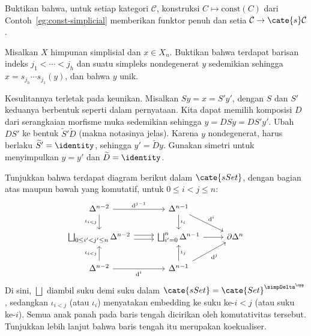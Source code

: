 
\hypertarget{o014.aljabr2.chapter8.exercises-a}{ }
\begin{Exercises}
	\item Buktikan bahwa, untuk setiap kategori $\mathcal{C}$, konstruksi
	$C\mapsto\mathrm{const}(C)$ dari Contoh~\ref{eg:const-simplicial}
	memberikan funktor penuh dan setia
	$\mathcal{C}\to\cate{s}\mathcal{C}$.

	\item Misalkan $X$ himpunan simplisial dan $x\in X_n$. Buktikan bahwa
	terdapat barisan indeks $j_1<\cdots<j_h$ dan suatu simpleks nondegenerat
	$y$ sedemikian sehingga $x=s_{j_h}\cdots s_{j_1}(y)$, dan bahwa $y$ unik.

	\begin{hint}
		Kesulitannya terletak pada keunikan. Misalkan
		$Sy=x=S'y'$, dengan $S$ dan $S'$ keduanya berbentuk seperti dalam
		pernyataan. Kita dapat memilih komposisi $D$ dari serangkaian morfisme muka
		sedemikian sehingga $y=DSy=DS'y'$. Ubah $DS'$ ke bentuk
		$\widetilde{S}'\widetilde{D}$ (makna notasinya jelas). Karena $y$
		nondegenerat, harus berlaku $\widetilde{S}'=\identity$, sehingga
		$y'=\widetilde{D}y$. Gunakan simetri untuk menyimpulkan
		$y=y'$ dan $\widetilde{D}=\identity$.
	\end{hint}

	\item Tunjukkan bahwa terdapat diagram berikut dalam $\cate{sSet}$, dengan
	bagian atas maupun bawah yang komutatif, untuk
	$0\leq i<j\leq n$:
	\[\begin{tikzcd}
		\Delta^{n-2} \arrow[d, "{\iota_{i < j}}"'] \arrow[r, "{\mathrm{d}^{j-1}}"] & \Delta^{n-1} \arrow[d, "\iota_i"] \arrow[rd, "{\mathrm{d}^i}"] & \\
		\bigsqcup_{0 \leq i' < j' \leq n} \Delta^{n-2} \arrow[shift left, r] \arrow[shift right, r] & \bigsqcup_{i' = 0}^n \Delta^{n-1} \arrow[r] & \partial \Delta^n \\
		\Delta^{n-2} \arrow[u, "{\iota_{i < j}}"] \arrow[r, "{\mathrm{d}^i}"'] & \Delta^{n-1} \arrow[u, "\iota_j"'] \arrow[ru, "{\mathrm{d}^j}"'] &
	\end{tikzcd}\]
	Di sini, $\bigsqcup$ diambil suku demi suku dalam
	$\cate{sSet}=\cate{Set}^{\simpDelta^{\opp}}$, sedangkan
	$\iota_{i<j}$ (atau $\iota_i$) menyatakan embedding ke suku ke-$i<j$
	(atau suku ke-$i$). Semua anak panah pada baris tengah dicirikan oleh
	komutativitas tersebut. Tunjukkan lebih lanjut bahwa baris tengah itu
	merupakan koekualiser.


\end{Exercises}
